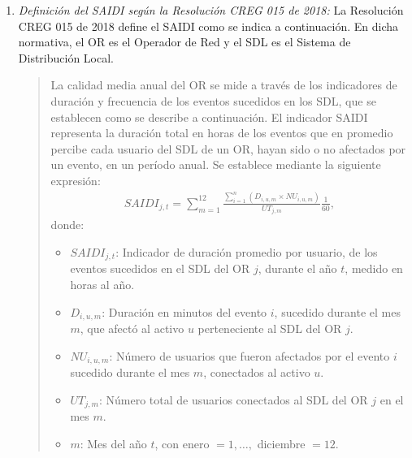      \begin{enumerate}
          \item \textit{Definición del SAIDI según la Resolución CREG 015 de 2018:}
           La Resolución CREG 015 de 2018 define el SAIDI como se indica a continuación. En dicha normativa, el OR es el Operador de Red y el SDL es el Sistema de Distribución Local.
            \begin{quote}
                La calidad media anual del OR se mide a través de los indicadores de duración y frecuencia de los eventos sucedidos en los SDL, que se establecen como se describe a continuación. El indicador SAIDI representa la duración total en horas de los eventos que en promedio percibe cada usuario del SDL de un OR, hayan sido o no afectados por un evento, en un período anual. Se establece mediante la siguiente expresión:     
                \begin{equation}
                    \begin{aligned}
                    SAIDI_{j,t}
                        =
                        \sum_{m=1}^{12}
                        \frac{
                            \sum_{i=1}^{n}
                            \left(D_{i,u,m}\times NU_{i,u,m}\right)
                        }{
                            UT_{j,m}
                        }
                        \frac{1}{60},
                    \end{aligned}
                \label{eq:saidi_creg_015_2018}
                \end{equation}
                donde:
                \begin{itemize} 
                    \item $SAIDI_{j,t}$: Indicador de duración promedio por usuario, de los eventos sucedidos en el SDL del OR $j$, durante el año $t$, medido en horas al año. 
                    \item $D_{i,u,m}$: Duración en minutos del evento $i$, sucedido durante el mes $m$, que afectó al activo $u$ perteneciente al SDL del OR $j$. 
                    \item $NU_{i,u,m}$: Número de usuarios que fueron afectados por el evento $i$ sucedido durante el mes $m$, conectados al activo $u$. 
                    \item $UT_{j,m}$: Número total de usuarios conectados al SDL del OR $j$ en el mes $m$. 
                    \item $m$: Mes del año $t$, con enero $= 1, \ldots,$ diciembre $= 12$. 
                \end{itemize}
            \end{quote}


\end{enumerate}
